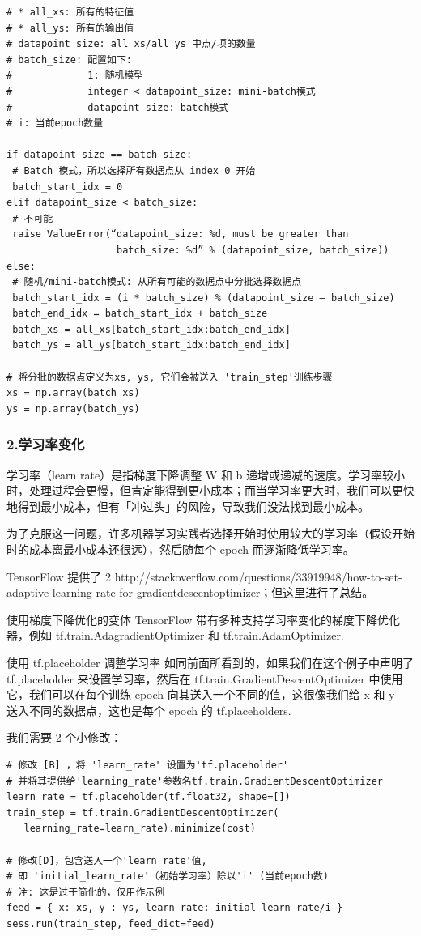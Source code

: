 \documentclass[11pt]{book} %
\begin{document}
\begin{verbatim}
# * all_xs: 所有的特征值
# * all_ys: 所有的输出值
# datapoint_size: all_xs/all_ys 中点/项的数量
# batch_size: 配置如下:
#             1: 随机模型
#             integer < datapoint_size: mini-batch模式
#             datapoint_size: batch模式
# i: 当前epoch数量

if datapoint_size == batch_size:
 # Batch 模式，所以选择所有数据点从 index 0 开始
 batch_start_idx = 0
elif datapoint_size < batch_size:
 # 不可能
 raise ValueError(“datapoint_size: %d, must be greater than         
                   batch_size: %d” % (datapoint_size, batch_size))
else:
 # 随机/mini-batch模式: 从所有可能的数据点中分批选择数据点
 batch_start_idx = (i * batch_size) % (datapoint_size — batch_size)
 batch_end_idx = batch_start_idx + batch_size
 batch_xs = all_xs[batch_start_idx:batch_end_idx]
 batch_ys = all_ys[batch_start_idx:batch_end_idx]

# 将分批的数据点定义为xs, ys, 它们会被送入 'train_step'训练步骤
xs = np.array(batch_xs)
ys = np.array(batch_ys)
\end{verbatim}

\subsubsection{2.学习率变化}

学习率（learn rate）是指梯度下降调整 W 和 b 递增或递减的速度。学习率较小时，处理过程会更慢，但肯定能得到更小成本；而当学习率更大时，我们可以更快地得到最小成本，但有「冲过头」的风险，导致我们没法找到最小成本。

为了克服这一问题，许多机器学习实践者选择开始时使用较大的学习率（假设开始时的成本离最小成本还很远），然后随每个 epoch 而逐渐降低学习率。

TensorFlow 提供了 2 http://stackoverflow.com/questions/33919948/how-to-set-adaptive-learning-rate-for-gradientdescentoptimizer；但这里进行了总结。

使用梯度下降优化的变体
TensorFlow 带有多种支持学习率变化的梯度下降优化器，例如  tf.train.AdagradientOptimizer 和 tf.train.AdamOptimizer.

使用 tf.placeholder 调整学习率
如同前面所看到的，如果我们在这个例子中声明了 tf.placeholder 来设置学习率，然后在 tf.train.GradientDescentOptimizer 中使用它，我们可以在每个训练 epoch 向其送入一个不同的值，这很像我们给 x 和 y\_ 送入不同的数据点，这也是每个 epoch 的 tf.placeholders.

我们需要 2 个小修改：
\begin{verbatim}
# 修改 [B] ，将 'learn_rate' 设置为'tf.placeholder'
# 并将其提供给'learning_rate'参数名tf.train.GradientDescentOptimizer
learn_rate = tf.placeholder(tf.float32, shape=[])
train_step = tf.train.GradientDescentOptimizer(
   learning_rate=learn_rate).minimize(cost)

# 修改[D]，包含送入一个'learn_rate'值,
# 即 'initial_learn_rate'（初始学习率）除以'i' (当前epoch数)
# 注: 这是过于简化的，仅用作示例
feed = { x: xs, y_: ys, learn_rate: initial_learn_rate/i }
sess.run(train_step, feed_dict=feed)
\end{verbatim}
\end{document}
